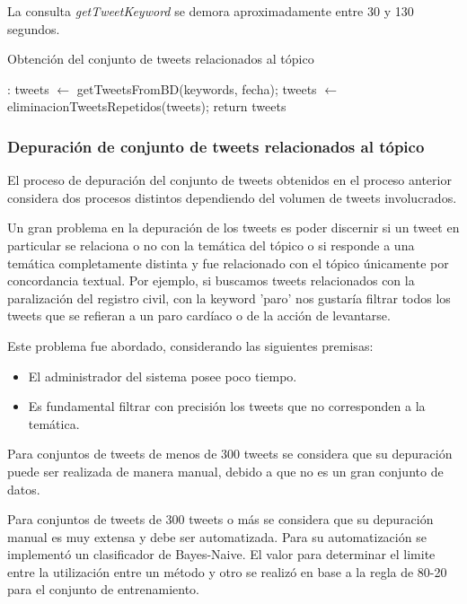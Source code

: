 La consulta \emph{getTweetKeyword} se demora aproximadamente entre 30 y 130 segundos.

\begin{algorithm}[H]
	\caption{Obtención del conjunto de tweets relacionados al tópico}\label{getTweetsKeyword}
	\begin{algorithmic}[1]
		
		:
		\State tweets $\gets$ getTweetsFromBD(keywords, fecha);
		\State tweets $\gets$ eliminacionTweetsRepetidos(tweets);
		\State return tweets
		\EndFunction
	\end{algorithmic}
\end{algorithm}	



\subsubsection{Depuración de conjunto de tweets relacionados al tópico}

El proceso de depuración del conjunto de tweets obtenidos en el proceso anterior considera dos procesos distintos dependiendo del volumen de tweets involucrados.

Un gran problema en la depuración de los tweets es poder discernir si un tweet en particular se relaciona o no con la temática del tópico o si responde a una temática completamente distinta y fue relacionado con el tópico únicamente por concordancia textual. Por ejemplo, si buscamos tweets relacionados con la paralización del registro civil, con la keyword 'paro' nos gustaría filtrar todos los tweets que se refieran a un paro cardíaco o de la acción de levantarse.

Este problema fue abordado, considerando las siguientes premisas:
\begin{itemize}
	\item El administrador del sistema posee poco tiempo.
	\item Es fundamental filtrar con precisión los tweets que no corresponden a la temática.
\end{itemize}

Para conjuntos de tweets de menos de 300 tweets se considera que su depuración puede ser realizada de manera manual, debido a que no es un gran conjunto de datos.

Para conjuntos de tweets de 300 tweets o más se considera que su depuración manual es muy extensa y debe ser automatizada. Para su automatización se implementó un clasificador de Bayes-Naive. El valor para determinar el limite entre la utilización entre un método y otro se realizó en base a la regla de 80-20 para el conjunto de entrenamiento.

